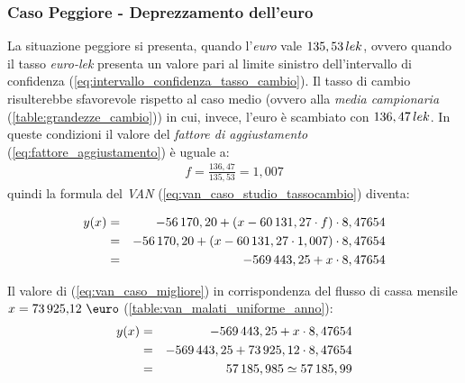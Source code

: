 \subsubsection[Caso Peggiore - Deprezzamento dell'euro]{Caso Peggiore - Deprezzamento dell'euro}
\label{sec:cambio_favorevole}
La situazione peggiore si presenta, quando l'\emph{euro} vale $135,53 \thinspace lek$, ovvero quando il tasso \emph{euro-lek} presenta un valore pari al limite sinistro dell'intervallo di confidenza (\ref{eq:intervallo_confidenza_tasso_cambio}). Il tasso di cambio risulterebbe sfavorevole rispetto al caso medio (ovvero alla \textit{media campionaria} (\ref{table:grandezze_cambio})) in cui, invece, l'euro è scambiato con $136,47 \thinspace lek$.\newline
In queste condizioni il valore del \textit{fattore di aggiustamento}  (\ref{eq:fattore_aggiustamento}) è uguale a:
\begin{equation}
\label{eq:fattore_aggiustamento_caso_migliore}
\begin{split}
f = \frac{136,47}{135,53} = 1,007
\end{split}
\end{equation}
quindi la formula del \emph{\ac{VAN}} (\ref{eq:van_caso_studio_tassocambio}) diventa:

\begin{eqnarray}
\label{eq:van_caso_migliore}
 		y(x) & = & -56\thinspace 170,20 + (x - 60\thinspace 131,27 \cdot f) \cdot 8,47654 \nonumber \\
 			 & = & -56\thinspace 170,20 + (x - 60\thinspace 131,27 \cdot 1,007) \cdot 8,47654 \nonumber \\
 			 & = & -569\thinspace 443,25 + x \cdot 8,47654
\end{eqnarray}

Il valore di (\ref{eq:van_caso_migliore}) in corrispondenza del flusso di cassa mensile $ x = \mbox{73\thinspace 925,12 \euro}$ (\ref{table:van_malati_uniforme_anno}):
\begin{eqnarray}
\label{eq:van_flusso_cassa_malati_uniforme_caso_migliore}
 		y(x) & = & -569\thinspace 443,25 + x \cdot 8,47654 \nonumber \\
 			 & = & -569\thinspace 443,25 + 73\thinspace 925,12 \cdot 8,47654 \nonumber \\
 			 & = & 57\thinspace 185,985 \simeq 57\thinspace 185,99
\end{eqnarray}

